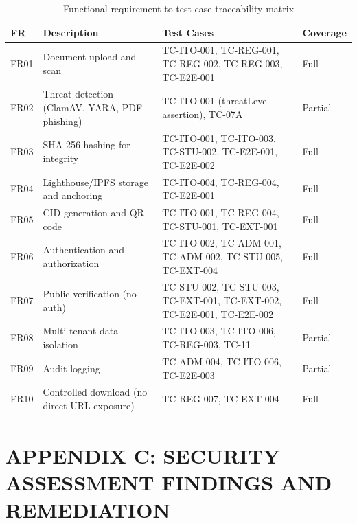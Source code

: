 \begin{table}[H]
  \centering
  \smalltable
  \footnotesize
  {%
  \setlength{\tabcolsep}{5pt}
  \renewcommand{\arraystretch}{1.2}
  \begin{tabular}{|>{\centering\arraybackslash}p{}|
                  >{\raggedright\arraybackslash}p{}|
                  >{\raggedright\arraybackslash}p{}|
                  >{\centering\arraybackslash}p{}|}
    \hline
    \textbf{FR} & \textbf{Description} & \textbf{Test Cases} & \textbf{Coverage} \\
    \hline\hline
    FR01 & Document upload and scan & TC-ITO-001, TC-REG-001, TC-REG-002, TC-REG-003, TC-E2E-001 & Full \\
    \hline
    FR02 & Threat detection (ClamAV, YARA, PDF phishing) & TC-ITO-001 (threatLevel assertion), TC-07A & Partial \\
    \hline
    FR03 & SHA-256 hashing for integrity & TC-ITO-001, TC-ITO-003, TC-STU-002, TC-E2E-001, TC-E2E-002 & Full \\
    \hline
    FR04 & Lighthouse/IPFS storage and anchoring & TC-ITO-004, TC-REG-004, TC-E2E-001 & Full \\
    \hline
    FR05 & CID generation and QR code & TC-ITO-001, TC-REG-004, TC-STU-001, TC-EXT-001 & Full \\
    \hline
    FR06 & Authentication and authorization & TC-ITO-002, TC-ADM-001, TC-ADM-002, TC-STU-005, TC-EXT-004 & Full \\
    \hline
    FR07 & Public verification (no auth) & TC-STU-002, TC-STU-003, TC-EXT-001, TC-EXT-002, TC-E2E-001, TC-E2E-002 & Full \\
    \hline
    FR08 & Multi-tenant data isolation & TC-ITO-003, TC-ITO-006, TC-REG-003, TC-11 & Partial \\
    \hline
    FR09 & Audit logging & TC-ADM-004, TC-ITO-006, TC-E2E-003 & Partial \\
    \hline
    FR10 & Controlled download (no direct URL exposure) & TC-REG-007, TC-EXT-004 & Full \\
    \hline
  \end{tabular}
  }%
  \captionsetup{type=table}
  \caption{Functional requirement to test case traceability matrix}
  \label{tab:func-coverage}
\end{table}

\clearpage
\section{APPENDIX C: SECURITY ASSESSMENT FINDINGS AND REMEDIATION}
\label{appendix:security}

